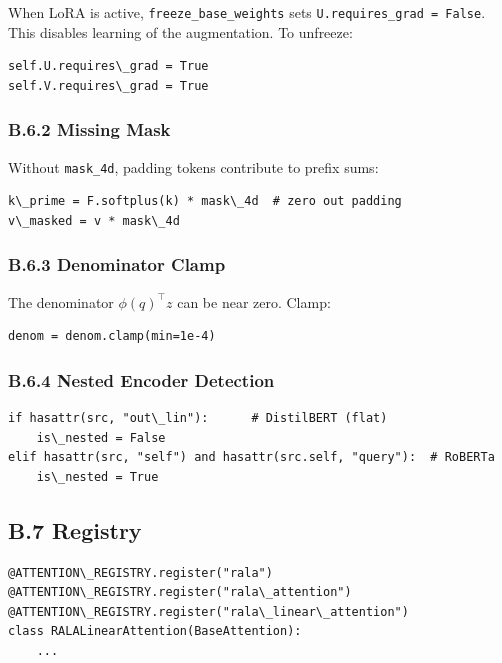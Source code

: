 When LoRA is active, \texttt{freeze\_base\_weights} sets \texttt{U.requires\_grad = False}. 
This disables learning of the augmentation. To unfreeze:

\begin{lstlisting}
self.U.requires\_grad = True
self.V.requires\_grad = True
\end{lstlisting}

\subsubsection{B.6.2 Missing Mask}

Without \texttt{mask\_4d}, padding tokens contribute to prefix sums:

\begin{lstlisting}
k\_prime = F.softplus(k) * mask\_4d  # zero out padding
v\_masked = v * mask\_4d
\end{lstlisting}

\subsubsection{B.6.3 Denominator Clamp}

The denominator $\phi(q)^\top z$ can be near zero. Clamp:

\begin{lstlisting}
denom = denom.clamp(min=1e-4)
\end{lstlisting}

\subsubsection{B.6.4 Nested Encoder Detection}

\begin{lstlisting}
if hasattr(src, "out\_lin"):      # DistilBERT (flat)
    is\_nested = False
elif hasattr(src, "self") and hasattr(src.self, "query"):  # RoBERTa
    is\_nested = True
\end{lstlisting}

\subsection{B.7 Registry}

\begin{lstlisting}
@ATTENTION\_REGISTRY.register("rala")
@ATTENTION\_REGISTRY.register("rala\_attention")
@ATTENTION\_REGISTRY.register("rala\_linear\_attention")
class RALALinearAttention(BaseAttention):
    ...
\end{lstlisting}

